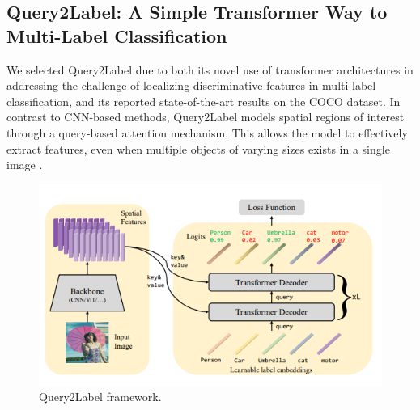 \documentclass[lettersize,journal]{IEEEtran}
\begin{document}
\subsection{Query2Label: A Simple Transformer Way to Multi-Label Classification}
\label{sec:q2l_method}
We selected Query2Label \cite{Query2Label} due to both its novel use of transformer architectures in addressing the challenge of localizing discriminative features in multi-label classification, and its reported state-of-the-art results on the COCO dataset. In contrast to CNN-based methods, Query2Label models spatial regions of interest through a query-based attention mechanism. This allows the model to effectively extract features, even when multiple objects of varying sizes exists in a single image \cite{Query2Label}.

\begin{figure}[t]
    \centering
    \includegraphics[width=.8\linewidth]{images/q2l_framework.PNG}
    \caption{Query2Label framework.}
    \label{fig:q2l_framework}
\end{figure}


\end{document}
